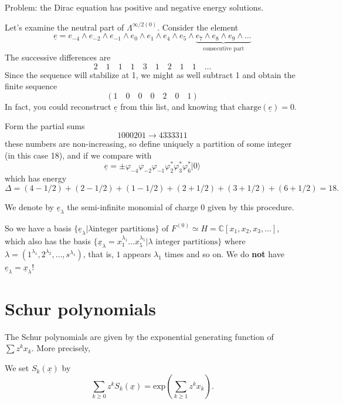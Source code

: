 Problem: the Dirac equation has positive and
negative
energy solutions.

\medskip\noindent
Let's examine the neutral part
of $\Lambda^{\infty/2(0)}$.
Consider the element
$$
\underline{e}=e_{-4}\wedge e_{-2}\wedge
e_{-1}
\wedge e_0 \wedge e_1 \wedge e_4 \wedge e_5
\wedge\underbrace{ e_7 \wedge e_8 \wedge
e_9\wedge\ldots
}_{\text{consecutive part}}
$$
The successive differences are
$$
2\quad 1 \quad  1\quad 1 \quad 3 \quad 1
\quad 2 \quad 1
\quad  1 \quad  \ldots
$$
Since the sequence will stabilize at 1,
we might as well subtract 1 and obtain the
finite
sequence
$$
(1\quad 0\quad 0\quad 0\quad 2\quad 0\quad 1)
$$
In fact, you could reconstruct
$\underline{e}$
from this list, and knowing that
$\text{charge}(\underline{e})=0$.

Form the partial sums
$$
1000201 \to 4333311
$$
these numbers are non-increasing,
so define uniquely a partition of some
integer
(in this case 18),
and if we compare with
$$
\underline{e}=\pm
\varphi_{-4}\varphi_{-2}\varphi_{-1}
\varphi^*_2\varphi_3^*\varphi_6^*|0\rangle
$$
which has energy
$$
\Delta=(4-1/2)+(2-1/2)+(1-1/2)
+(2+1/2)+(3+1/2)+(6+1/2)=18.
$$

\noindent
We denote by $\underline{e}_\lambda$
the semi-infinite monomial of charge 0 given
by
this procedure.

\medskip\noindent
So we have a basis
$\{\underline{e}_\lambda|\lambda\text{
integer partitions}\}$
of $F^{(0)}\simeq H =
\mathbb{C}[x_1,x_2,x_3,\ldots]$,
which also has the basis
$\{\underline{x}_\lambda=x_1^{\lambda_1}
\ldots
x_5^{\lambda_5}|
\lambda \text{ integer partitions}\}$
where
$\lambda=(1^{\lambda_1},2^{\lambda_2},\ldots,
s^{\lambda_s})$,
that is, $1$ appears $\lambda_1$ times and so
on.
We do {\bf not} have
$\underline{e}_\lambda=\underline{x}
_\lambda$!

\section{Schur polynomials}
\label{section-schur-polynomials}

The Schur polynomials are given by
the exponential generating function of $\sum
z^kx_k$.
More precisely,

\begin{definition}
\label{definition-schur-polynomial}
We set  $S_k(\underline{x})$ by
$$
\sum_{k \geq 0}z^k S_k(\underline{x})
=\text{exp}\left(\sum_{k \geq 1}z^k
x_k\right).
$$
\end{definition}

